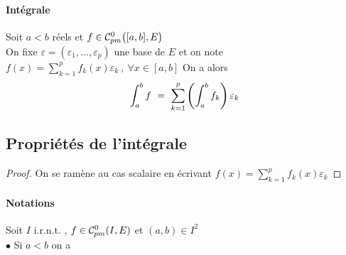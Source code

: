     	 \medskip
    	
    	
    	\traitd
    	\paragraph{Intégrale}
			Soit $a<b$ réels et $f\in{\mathcal{C}_{pm}^0} \big( [a,b],E \big)$ \\On fixe $\varepsilon = (\varepsilon_1 , \dots , \varepsilon_p)$ une base de $E$ et on note $f(x) = \sum_{k=1}^p f_k(x) \varepsilon_k ~,~\forall x\in [a,b]$ On a alors 
			\[ 
				\int_a^b f ~=~ \sum_{k=1}^{p} \left( \int_a^b f_k \right) \varepsilon_k 
			\vspace{-10pt}
			\] 
		\trait \medskip
		
		
	\subsection{Propriétés de l'intégrale}

		
		\begin{proof} 
		On se ramène au cas scalaire en écrivant $f(x) = \sum_{k=1}^p f_k(x) \varepsilon_k$ 
		\end{proof} \medskip
		
		
    	\paragraph{Notations}
		Soit $I$ i.r.n.t. , $f\in{\mathcal{C}_{pm}^0}(I,E)$ et $(a,b)\in I^2$ \\ 
		
		
		$\bullet$ Si $a<b$ on a  \\ 
		
